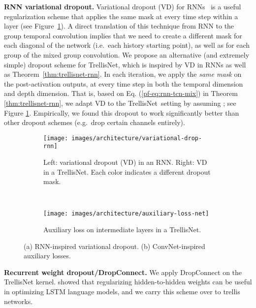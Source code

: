 \documentclass{article} \usepackage{iclr2019_conference,times}
\newcommand\mypara[1]{\vspace{0mm}\noindent\textbf{#1}}
\newcommand{\model}{TrellisNet}
\begin{document}
\mypara{RNN variational dropout.}
Variational dropout (VD) for RNNs~\citep{gal2016dropout} is a useful regularization scheme that applies the same mask at every time step within a layer (see Figure~\ref{fig:variational-dropout}). A direct translation of this technique from RNN to the group temporal convolution implies that we need to create a different mask for each diagonal of the network (i.e.\ each history starting point), as well as for each group of the mixed group convolution. We propose an alternative (and extremely simple) dropout scheme for TrellisNet, which is inspired by VD in RNNs as well as Theorem~\ref{thm:trellisnet-rnn}. In each iteration, we apply the \emph{same mask} on the post-activation outputs, at every time step in both the temporal dimension and depth dimension. That is, based on Eq. (\ref{pf-eq:rnn-tcn-mix}) in Theorem \ref{thm:trellisnet-rnn}, we adapt VD to the \model~setting by assuming ; see Figure \ref{fig:variational-dropout}. Empirically, we found this dropout to work significantly better than other dropout schemes (e.g.\ drop certain channels entirely).

\begin{figure}
\centering
\vspace{-.3in}
    \begin{subfigure}[b]{.6\textwidth}
        \centering
        \texttt{[image: images/architecture/variational-drop-rnn]}
        \caption{Left: variational dropout (VD) in an RNN. Right: VD in a TrellisNet. Each color indicates a different dropout mask.}
        \label{fig:variational-dropout}
    \end{subfigure}
    ~
    \begin{subfigure}[b]{.38\textwidth}
        \centering
        \texttt{[image: images/architecture/auxiliary-loss-net]}
        \caption{Auxiliary loss on intermediate layers in a \model.}
        \label{fig:auxiliary-loss}
    \end{subfigure}
\caption{(a) RNN-inspired variational dropout. (b) ConvNet-inspired auxiliary losses.}
\label{fig:vd-auxiliary}
\vspace{-.15in}
\end{figure}

\mypara{Recurrent weight dropout/DropConnect.} We apply DropConnect on the TrellisNet kernel. \cite{merityRegOpt} showed that regularizing hidden-to-hidden weights  can be useful in optimizing LSTM language models, and we carry this scheme over to trellis networks.
\end{document}
